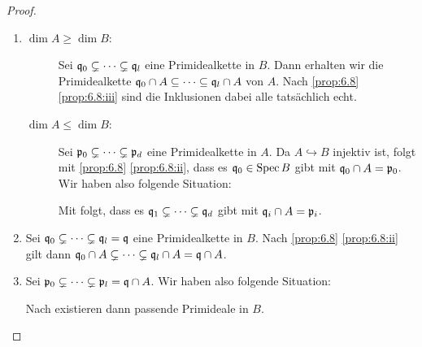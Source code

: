 \documentclass[12pt,a4paper]{scrartcl}
\theoremstyle{cplain}
\theoremstyle{cdef}
\begin{document}
\begin{proof}
	\leavevmode
	\begin{enumerate}[label=\ref{prop:ganz dim:\roman*}]
		\item \begin{description}
			\item[$\dim A \ge \dim B$:] Sei $\mathfrak{q}_0\subsetneq \dots \subsetneq \mathfrak{q}_l$ eine Primidealkette in $B$. Dann erhalten wir die Primidealkette $\mathfrak{q}_0\cap A \subseteq \dots \subseteq \mathfrak{q}_l\cap A$ von $A$. Nach \cref{prop:6.8} \ref{prop:6.8:iii} sind die Inklusionen dabei alle tatsächlich echt.
			\item[$\dim A \le \dim B$:] Sei $\mathfrak{p}_0\subsetneq\dots\subsetneq \mathfrak{p}_d$ eine Primidealkette in $A$. Da $A\hookrightarrow B$ injektiv ist, folgt mit \cref{prop:6.8} \ref{prop:6.8:ii}, dass es $\mathfrak{q}_0\in \operatorname{Spec} B$ gibt mit $\mathfrak{q}_0\cap A = \mathfrak{p}_0$. Wir haben also folgende Situation:
			\begin{center}
			\end{center}
			Mit  folgt, dass es $\mathfrak{q}_1\subsetneq\dots \subsetneq \mathfrak{q}_d$ gibt mit $\mathfrak{q}_i\cap A = \mathfrak{p}_i$.
		\end{description}
		\item Sei $\mathfrak{q}_0\subsetneq \dots \subsetneq \mathfrak{q}_l = \mathfrak{q}$ eine Primidealkette in $B$. Nach \cref{prop:6.8} \ref{prop:6.8:ii} gilt dann $\mathfrak{q}_0\cap A\subsetneq \dots \subsetneq \mathfrak{q}_l\cap A = \mathfrak{q} \cap A$.
		\item Sei $\mathfrak{p}_0\subsetneq \dots \subsetneq \mathfrak{p}_l = \mathfrak{q} \cap A$. Wir haben also folgende Situation:
		\begin{center}
		\end{center}
		Nach  existieren dann passende Primideale in $B$.
		\qedhere
	\end{enumerate}
\end{proof}
\end{document}
